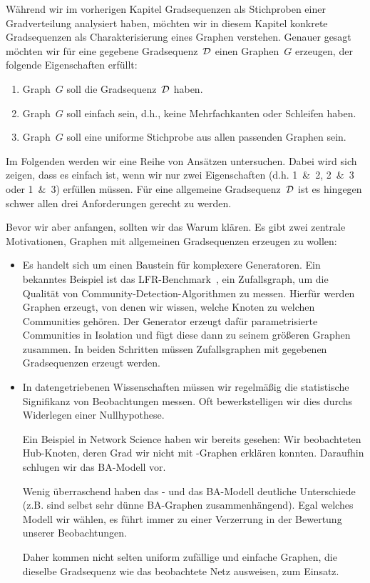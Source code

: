 Während wir im vorherigen Kapitel Gradsequenzen als Stichproben einer Gradverteilung analysiert haben, möchten wir in diesem Kapitel konkrete Gradsequenzen als Charakterisierung eines Graphen verstehen.
Genauer gesagt möchten wir für eine gegebene Gradsequenz~$\mathcal{D}$ einen Graphen~$G$ erzeugen, der folgende Eigenschaften erfüllt:
\begin{enumerate}
    \item Graph~$G$ soll die Gradsequenz~$\mathcal{D}$ haben.
    \item Graph~$G$ soll einfach sein, d.h., keine Mehrfachkanten oder Schleifen haben.
    \item Graph~$G$ soll eine uniforme Stichprobe aus allen passenden Graphen sein.
\end{enumerate}

Im Folgenden werden wir eine Reihe von Ansätzen untersuchen.
Dabei wird sich zeigen, dass es einfach ist, wenn wir nur zwei Eigenschaften (d.h. 1~\&~2, 2~\&~3 oder 1~\&~3) erfüllen müssen.
Für eine allgemeine Gradsequenz~$\mathcal{D}$ ist es hingegen schwer allen drei Anforderungen gerecht zu werden.

Bevor wir aber anfangen, sollten wir das Warum klären.
Es gibt zwei zentrale Motivationen, Graphen mit allgemeinen Gradsequenzen erzeugen zu wollen:
\begin{itemize}
    \item
          Es handelt sich um einen Baustein für komplexere Generatoren.
          Ein bekanntes Beispiel ist das LFR-Benchmark~\cite{lancichinetti2008benchmark}, ein Zufallsgraph, um die Qualität von Community-Detection-Algorithmen zu messen.
          Hierfür werden Graphen erzeugt, von denen wir wissen, welche Knoten zu welchen Communities gehören.
          Der Generator erzeugt dafür parametrisierte Communities in Isolation und fügt diese dann zu seinem größeren Graphen zusammen.
          In beiden Schritten müssen Zufallsgraphen mit gegebenen Gradsequenzen erzeugt werden.

    \item
          In datengetriebenen Wissenschaften müssen wir regelmäßig die statistische Signifikanz von Beobachtungen messen.
          Oft bewerkstelligen wir dies durchs Widerlegen einer Nullhypothese.

          Ein Beispiel in Network Science haben wir bereits gesehen:
          Wir beobachteten Hub-Knoten, deren Grad wir nicht mit \Gnp-Graphen erklären konnten.
          Daraufhin schlugen wir das BA-Modell vor.

          Wenig überraschend haben das \Gnp- und das BA-Modell deutliche Unterschiede (z.B. sind selbst sehr dünne BA-Graphen zusammenhängend).
          Egal welches Modell wir wählen, es führt immer zu einer Verzerrung in der Bewertung unserer Beobachtungen.

          Daher kommen nicht selten uniform zufällige und einfache Graphen, die dieselbe Gradsequenz wie das beobachtete Netz ausweisen, zum Einsatz.
\end{itemize}

